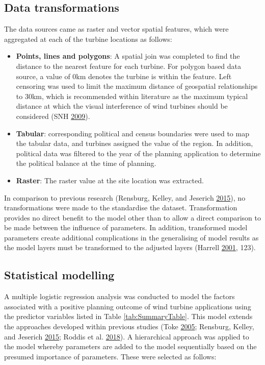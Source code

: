 \documentclass[a4paper,]{article}
\providecommand{\tightlist}{%
  \setlength{\itemsep}{0pt}\setlength{\parskip}{0pt}}
\theoremstyle{definition}
\theoremstyle{definition}
\theoremstyle{definition}
\theoremstyle{remark}
\begin{document}
\hypertarget{data-transformations}{%
\subsection{Data transformations}\label{data-transformations}}

The data sources came as raster and vector spatial features, which were
aggregated at each of the turbine locations as follows:

\begin{itemize}
\tightlist
\item
  \textbf{Points, lines and polygons}: A spatial join was completed to
  find the distance to the nearest feature for each turbine. For polygon
  based data source, a value of 0km denotes the turbine is within the
  feature. Left censoring was used to limit the maximum distance of
  geospatial relationships to 30km, which is recommended within
  literature as the maximum typical distance at which the visual
  interference of wind turbines should be considered (SNH
  \protect\hyperlink{ref-SNH2009}{2009}).
\item
  \textbf{Tabular}: corresponding political and census boundaries were
  used to map the tabular data, and turbines assigned the value of the
  region. In addition, political data was filtered to the year of the
  planning application to determine the political balance at the time of
  planning.
\item
  \textbf{Raster}: The raster value at the site location was extracted.
\end{itemize}

In comparison to previous research (Rensburg, Kelley, and Jeserich
\protect\hyperlink{ref-VanRensburg20}{2015}), no transformations were
made to the standardise the dataset. Transformation provides no direct
benefit to the model other than to allow a direct comparison to be made
between the influence of parameters. In addition, transformed model
parameters create additional complications in the generalising of model
results as the model layers must be transformed to the adjusted layers
(Harrell \protect\hyperlink{ref-Harrell2001}{2001}, 123).

\hypertarget{statistical-modelling}{%
\subsection{Statistical modelling}\label{statistical-modelling}}

A multiple logistic regression analysis was conducted to model the
factors associated with a positive planning outcome of wind turbine
applications using the predictor variables listed in Table
\ref{tab:SummaryTable}. This model extends the approaches developed
within previous studies (Toke \protect\hyperlink{ref-Toke2005}{2005};
Rensburg, Kelley, and Jeserich
\protect\hyperlink{ref-VanRensburg20}{2015}; Roddis et al.
\protect\hyperlink{ref-Roddis2018}{2018}). A hierarchical approach was
applied to the model whereby parameters are added to the model
sequentially based on the presumed importance of parameters. These were
selected as follows:
\end{document}
